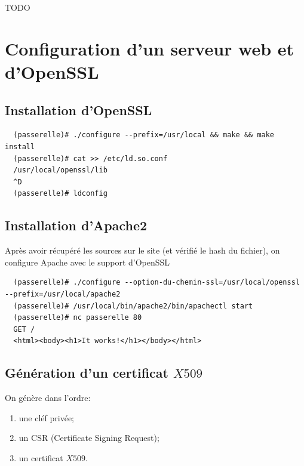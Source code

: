 \documentclass[a4paper]{article}
\begin{document}
TODO

\section{Configuration d'un serveur web et d'OpenSSL}
\subsection{Installation d'OpenSSL}
\begin{verbatim}
  (passerelle)# ./configure --prefix=/usr/local && make && make install
  (passerelle)# cat >> /etc/ld.so.conf
  /usr/local/openssl/lib
  ^D
  (passerelle)# ldconfig
\end{verbatim}

\subsection{Installation d'Apache2}
Après avoir récupéré les sources sur le site (et vérifié le hash du fichier), on configure
Apache avec le support d'OpenSSL
\begin{verbatim}
  (passerelle)# ./configure --option-du-chemin-ssl=/usr/local/openssl --prefix=/usr/local/apache2
  (passerelle)# /usr/local/bin/apache2/bin/apachectl start
  (passerelle)# nc passerelle 80
  GET /
  <html><body><h1>It works!</h1></body></html>
\end{verbatim}

\subsection{Génération d'un certificat $X509$}
On génère dans l'ordre:
\begin{enumerate}
	\item une cléf privée;
	\item un CSR (Certificate Signing Request);
	\item un certificat $X509$.
\end{enumerate}
\end{document}
